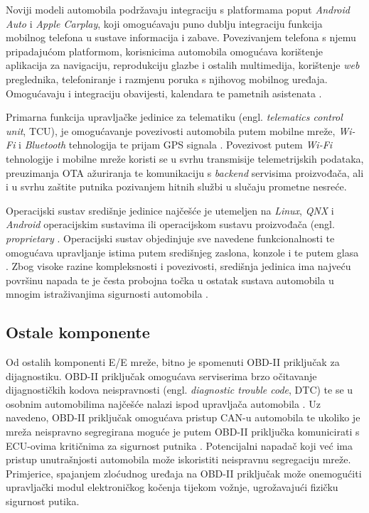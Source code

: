 \documentclass[times, utf8, diplomski, numeric]{fer}
\begin{document}
Noviji modeli automobila podržavaju integraciju s platformama poput \textit{Android Auto} i \textit{Apple Carplay}, koji omogućavaju puno dublju integraciju funkcija mobilnog telefona u sustave informacija i zabave. Povezivanjem telefona s njemu pripadajućom platformom, korisnicima automobila omogućava korištenje aplikacija za navigaciju, reprodukciju glazbe i ostalih multimedija, korištenje \textit{web} preglednika, telefoniranje i razmjenu poruka s njihovog mobilnog uređaja. Omogućavaju i integraciju obavijesti, kalendara te pametnih asistenata \cite{androidauto, carplay}.

Primarna funkcija upravljačke jedinice za telematiku (engl. \textit{telematics control unit}, TCU), je omogućavanje povezivosti automobila putem mobilne mreže, \textit{Wi-Fi} i \textit{Bluetooth} tehnologija te prijam GPS signala \cite{nasser2023automotive}. Povezivost putem \textit{Wi-Fi} tehnologije i mobilne mreže koristi se u svrhu transmisije telemetrijskih podataka, preuzimanja OTA ažuriranja te komunikaciju s \textit{backend} servisima proizvođača, ali i u svrhu zaštite putnika pozivanjem hitnih službi u slučaju prometne nesreće.

Operacijski sustav središnje jedinice najčešće je utemeljen na \textit{Linux}, \textit{QNX} i \textit{Android} operacijskim sustavima ili operacijskom sustavu proizvođača (engl. \textit{proprietary} \cite{nasser2023automotive}. Operacijski sustav objedinjuje sve navedene funkcionalnosti te omogućava upravljanje istima putem središnjeg zaslona, konzole i te putem glasa \cite{bosch2022handbook}. Zbog visoke razine kompleksnosti i povezivosti, središnja jedinica ima najveću površinu napada te je česta probojna točka u ostatak sustava automobila u mnogim istraživanjima sigurnosti automobila \cite{aliwa2021cyberattacks, knight2020hacking, smith2016car, tencent2018bmw, miller2015remote}.

\subsection{Ostale komponente}
Od ostalih komponenti E/E mreže, bitno je spomenuti OBD-II priključak za dijagnostiku. OBD-II priključak omogućava serviserima brzo očitavanje dijagnostičkih kodova neispravnosti (engl. \textit{diagnostic trouble code}, DTC) te se u osobnim automobilima najčešće nalazi ispod upravljača automobila \cite{smith2016car}. Uz navedeno, OBD-II priključak omogućava pristup CAN-u automobila te ukoliko je mreža neispravno segregirana moguće je putem OBD-II priključka  komunicirati s ECU-ovima kritičnima za sigurnost putnika \cite{knight2020hacking, smith2016car}. Potencijalni napadač koji već ima pristup unutrašnjosti automobila može iskoristiti neispravnu segregaciju mreže. Primjerice, spajanjem zloćudnog uređaja na OBD-II priključak može onemogućiti upravljački modul elektroničkog kočenja tijekom vožnje, ugrožavajući fizičku sigurnost putika.  
\end{document}
